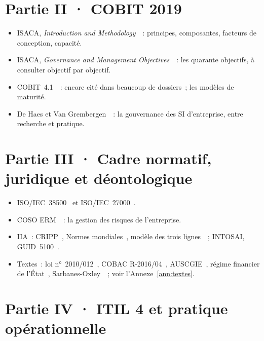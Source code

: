 \section*{Partie II · COBIT 2019}

\begin{itemize}
    \item ISACA, \emph{Introduction and Methodology}~\cite{isaca2018cobitintro}~:
          principes, composantes, facteurs de conception, capacité.
    \item ISACA, \emph{Governance and Management Objectives}~\cite{isaca2018cobitobjectifs}~:
          les quarante objectifs, à consulter objectif par objectif.
    \item COBIT~4.1~\cite{itgi2007cobit41}~: encore cité dans beaucoup de
          dossiers~; les modèles de maturité.
    \item De Haes et Van Grembergen~\cite{dehaes2015egit}~: la gouvernance
          des SI d'entreprise, entre recherche et pratique.
\end{itemize}

\section*{Partie III · Cadre normatif, juridique et déontologique}

\begin{itemize}
    \item ISO/IEC~38500~\cite{iso38500,iso38500_2024} et
          ISO/IEC~27000~\cite{iso27000_2018}.
    \item COSO ERM~\cite{coso2004ermfr,coso2017erm}~: la gestion des risques
          de l'entreprise.
    \item IIA~: CRIPP~\cite{iia2017cripp}, Normes mondiales~\cite{iia2024gias},
          modèle des trois lignes~\cite{iia2020troislignes}~; INTOSAI,
          GUID~5100~\cite{intosai2019guid5100}.
    \item Textes~: loi n°~2010/012~\cite{loi2010012}, COBAC
          R-2016/04~\cite{cobac2016r04}, AUSCGIE~\cite{ohada2014auscgie},
          régime financier de l'État~\cite{minfi2023regimefinancier},
          Sarbanes-Oxley~\cite{sox2002}~; voir l'Annexe~\ref{ann:textes}.
\end{itemize}

\section*{Partie IV · ITIL 4 et pratique opérationnelle}

